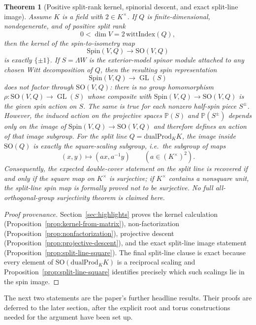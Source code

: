 \documentclass{birkjour}
\theoremstyle{plain}
\newtheorem{theorem}{Theorem}[section]
\theoremstyle{definition}
\theoremstyle{remark}
\newcommand{\Spin}{\mathrm{Spin}}
\newcommand{\SO}{\mathrm{SO}}
\newcommand{\dualProd}{\mathrm{dualProd}}
\newcommand{\wedgeW}{\Lambda W}
\begin{document}
\begin{theorem}[Positive split-rank kernel, spinorial descent, and exact split-line image]
\label{thm:kernel-nonfactor-split-line}
Assume $K$ is a field with $2\in K^\times$. If $Q$ is finite-dimensional,
nondegenerate, and of positive split rank
\[
  0<\dim V = 2\,\mathrm{wittIndex}(Q),
\]
then the kernel of the spin-to-isometry map
\[
  \Spin(V,Q) \to \SO(V,Q)
\]
is exactly $\{\pm1\}$. If $S=\wedgeW$ is the exterior-model spinor module
attached to any chosen Witt decomposition of $Q$, then the resulting spin
representation
\[
  \Spin(V,Q) \to \operatorname{GL}(S)
\]
does not factor through $\SO(V,Q)$: there is no group homomorphism
$\rho:\SO(V,Q)\to \operatorname{GL}(S)$ whose composite with
$\Spin(V,Q)\to\SO(V,Q)$ is the given spin action on $S$. The same is true for
each nonzero half-spin piece $S^\pm$. However, the induced action on the
projective spaces $\mathbb{P}(S)$ and $\mathbb{P}(S^\pm)$ depends only on the
image of $\Spin(V,Q)\to\SO(V,Q)$ and therefore defines an action of that image
subgroup. For the split line $Q=\dualProd_K K$, the image inside $\SO(Q)$ is
exactly the square-scaling subgroup, i.e.\ the subgroup of maps
\[
  (x,y)\longmapsto (a x, a^{-1} y)
  \qquad (a\in (K^\times)^2).
\]
Consequently, the expected double-cover statement on the split line is recovered
if and only if the square map on $K^\times$ is surjective; if $K^\times$
contains a nonsquare unit, the split-line spin map is formally proved not to be
surjective. No full all-orthogonal-group surjectivity theorem is claimed here.
\end{theorem}

\begin{proof}[Proof provenance]
Section~{}\ref{sec:highlights} proves the kernel calculation
(Proposition~{}\ref{prop:kernel-from-matrix}), non-factorization
(Proposition~{}\ref{prop:nonfactorization}), projective descent
(Proposition~{}\ref{prop:projective-descent}), and the exact split-line image
statement (Proposition~{}\ref{prop:split-line-square}). The final split-line
clause is exact because every element of $\SO(\dualProd_K K)$ is a reciprocal
scaling and Proposition~{}\ref{prop:split-line-square} identifies precisely which
such scalings lie in the spin image.
\end{proof}

The next two statements are the paper's further headline results. Their proofs
are deferred to the later section, after the explicit root and torus
constructions needed for the argument have been set up.
\end{document}
